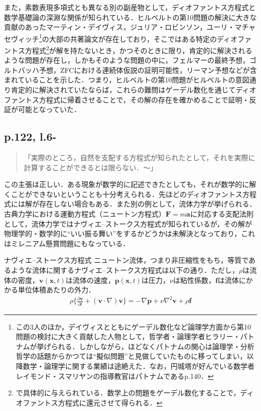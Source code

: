 \documentclass[10pt, a5paper, twoside]{ltjsarticle}
\newcommand{\hyphen}{\insertkanjiskip--\insertkanjiskip}
\begin{document}
            また，素数表現多項式とも異なる別の副産物として，ディオファントス方程式と数学基礎論の深淵な関係が知られている．ヒルベルトの第10問題の解決に大きな貢献のあったマーティン・デイヴィス，ジュリア・ロビンソン，ユーリ・マチャセヴィッチ\footnote{この3人のほか，デイヴィスとともにゲーデル数化など論理学方面から第10問題の検討に大きく貢献した人物として，哲学者・論理学者ヒラリー・パトナムが挙げられる．しかしながら，ほどなくパトナムの関心は論理学・分析哲学の話題からかつては“擬似問題”と見做していたものに移ってしまい，以降数学・論理学に関する業績は途絶えた．なお，円城塔が好んでいる数学者レイモンド・スマリヤンの指導教官はパトナムである\cite{hilbert}p.140．}の大部の共著論文が存在しており，そこではある特定のディオファントス方程式\footnote{\cite{legends}で具体的に与えられている．数学上の問題をゲーデル数化することで，ディオファントス方程式に還元させて得られる．}が解を持たないとき，かつそのときに限り，肯定的に解決されるような問題が存在し，しかもそのような問題の中に，フェルマーの最終予想，ゴルトバッハ予想，ZFCにおける連続体仮説の証明可能性，リーマン予想などが含まれていることを示した\cite{hilbert,legends}．つまり，ヒルベルトの第10問題がヒルベルトの意図通り肯定的に解決されていたならば，これらの難問はゲーデル数化を通じてディオファントス方程式に帰着させることで，その解の存在を確かめることで証明・反証が可能となっていた．

        \subsection{p.122, l.6-}

            \begin{quote}
                「実際のところ，自然を支配する方程式が知られたとして，それを実際に計算することができるとは限らない．〜」
            \end{quote}

            この主張は正しい．ある現象が数学的に記述できたとしても，それが数学的に解くことができないということも十分考えられる．先ほどのディオファントス方程式には解が存在しない場合もある．また別の例として，流体力学が挙げられる．古典力学における運動方程式（ニュートン方程式）$\bm{F}=m\bm{a}$に対応する支配法則として，流体力学ではナヴィエ\hyphen ストークス方程式が知られているが，その解が物理学的・数学的に“いい振る舞い”をするかどうかは未解決となっており，これはミレニアム懸賞問題にもなっている．

            \begin{dfn}{ナヴィエ\hyphen ストークス方程式}{}
                ニュートン流体，つまり非圧縮性をもち，等質であるような流体に関するナヴィエ\hyphen ストークス方程式は以下の通り．ただし，$\rho$は流体の密度，$\bm{v}(\bm{x}, t)$は流体の速度，$\bm{p}(\bm{x}, t)$は圧力，$\nu$は粘性係数，$\bm{f}$は流体にかかる単位体積あたりの外力．
                \begin{align*}
                    \rho \bigg\{ \frac{\partial \bm{v}}{\partial t} + ( \bm{v} \cdot \nabla) \bm{v} \bigg\} = - \nabla \bm{p} + \nu \nabla^2 \bm{v} + \rho \bm{f}
                \end{align*}
            \end{dfn}
\end{document}
